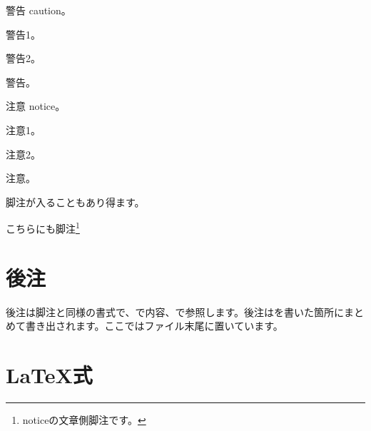 警告 caution。

\begin{reviewcaution}

警告1。

警告2。

\end{reviewcaution}
\begin{reviewcaution}

警告。

\end{reviewcaution}

注意 notice。

\begin{reviewnotice}

注意1。

注意2。

\end{reviewnotice}
\begin{reviewnotice}

注意。

\end{reviewnotice}

脚注が入ることもあり得ます。

\begin{reviewnotice}

こちらにも脚注\footnote{noticeの文章側脚注です。}

\end{reviewnotice}

\section{後注}
\label{sec:2-2}

後注は脚注と同様の書式で、で内容、で参照します。後注はを書いた箇所にまとめて書き出されます。ここではファイル末尾に置いています。

\section{LaTeX式}
\label{sec:2-3}


